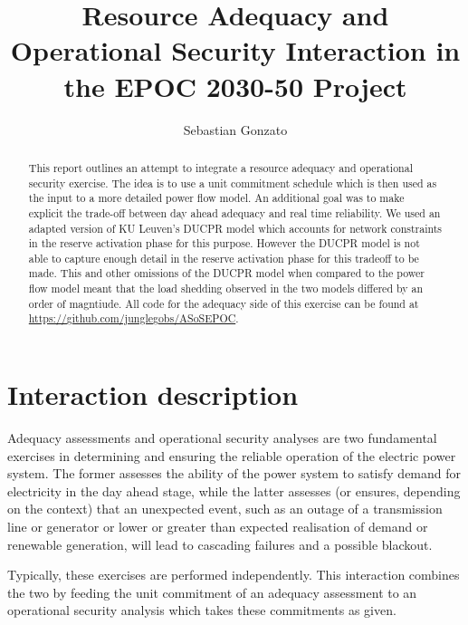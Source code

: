 \documentclass[number,times]{elsarticle}
\begin{document}
\title{Resource Adequacy and Operational Security Interaction in the EPOC 2030-50 Project}

\author{Sebastian Gonzato}

\maketitle

\begin{abstract}
    This report outlines an attempt to integrate a resource adequacy and operational security exercise. The idea is to use a unit commitment schedule which is then used as the input to a more detailed power flow model. An additional goal was to make explicit the trade-off between day ahead adequacy and real time reliability. We used an adapted version of KU Leuven's \ac{DUCPR} model which accounts for network constraints in the reserve activation phase for this purpose. However the \ac{DUCPR} model is not able to capture enough detail in the reserve activation phase for this tradeoff to be made. This and other omissions of the \ac{DUCPR} model when compared to the power flow model meant that the load shedding observed in the two models differed by an order of magntiude. All code for the adequacy side of this exercise can be found at \href{https://github.com/junglegobs/ASoSEPOC}{https://github.com/junglegobs/ASoSEPOC}.
\end{abstract}

\newpage

\tableofcontents



\newpage

\section{Interaction description}

Adequacy assessments and operational security analyses are two fundamental exercises in determining and ensuring the reliable operation of the electric power system. The former assesses the ability of the power system to satisfy demand for electricity in the day ahead stage, while the latter assesses (or ensures, depending on the context) that an unexpected event, such as an outage of a transmission line or generator or lower or greater than expected realisation of demand or renewable generation, will lead to cascading failures and a possible blackout.

Typically, these exercises are performed independently. This interaction combines the two by feeding the unit commitment of an adequacy assessment to an operational security analysis which takes these commitments as given.
\end{document}
